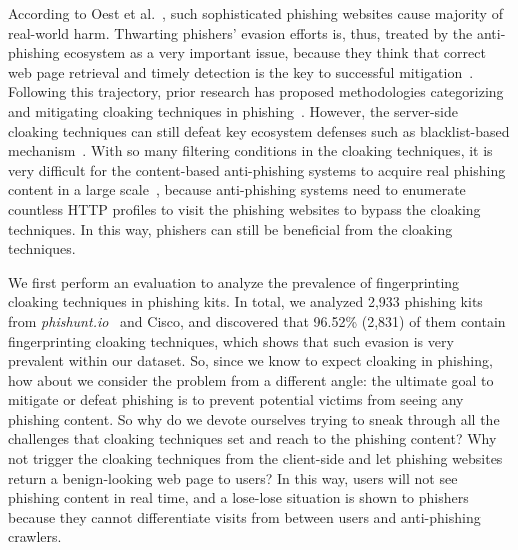 According to Oest et al.~\cite{oest2020sunrise}, such sophisticated phishing websites cause majority of real-world harm.
Thwarting phishers' evasion efforts is, thus, treated by the anti-phishing ecosystem as a very important issue,
because they think that correct web page retrieval and timely detection is the key to successful mitigation~\cite{oest2020sunrise, zhang2021crawlphish}.
Following this trajectory, prior research has proposed methodologies categorizing and mitigating cloaking techniques in phishing~\cite{oest2018inside, oest2019phishfarm, zhang2021crawlphish}.
However, the server-side cloaking techniques can still defeat key ecosystem defenses such as blacklist-based mechanism~\cite{oest2019phishfarm}.
With so many filtering conditions in the cloaking techniques,
it is very difficult for the content-based anti-phishing systems to acquire real phishing content in a large scale~\cite{oest2018inside, oest2020phishtime},
because anti-phishing systems need to enumerate countless HTTP profiles to visit the phishing websites to bypass the cloaking techniques.
In this way, phishers can still be beneficial from the cloaking techniques.


We first perform an evaluation to analyze the prevalence of fingerprinting cloaking techniques in phishing kits.
In total, we analyzed 2,933 phishing kits from \emph{phishunt.io}~\cite{phishunt} and Cisco, and discovered that 96.52\% (2,831) of them contain fingerprinting cloaking techniques, which shows that such evasion is very prevalent within our dataset.
So, since we know to expect cloaking in phishing, how about we consider the problem from a different angle:
the ultimate goal to mitigate or defeat phishing is to prevent potential victims from seeing any phishing content.
So why do we devote ourselves trying to sneak through all the challenges that cloaking techniques set and reach to the phishing content?
Why not trigger the cloaking techniques from the client-side and let phishing websites return a benign-looking web page to users?
In this way, users will not see phishing content in real time, and a lose-lose situation is shown to phishers because they cannot differentiate visits from between users and anti-phishing crawlers.

